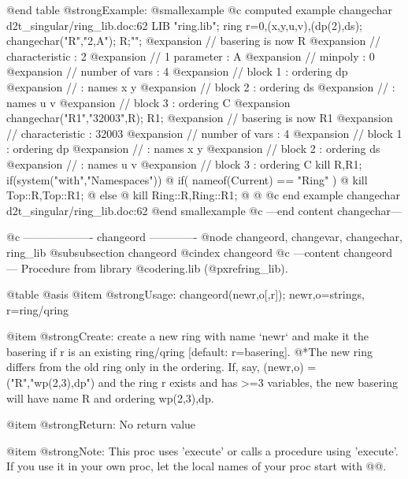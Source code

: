 @end table
@strong{Example:}
@smallexample
@c computed example changechar d2t_singular/ring_lib.doc:62 
LIB "ring.lib";
ring r=0,(x,y,u,v),(dp(2),ds);
changechar("R","2,A"); R;"";
@expansion{} // basering is now R
@expansion{} //   characteristic : 2
@expansion{} //   1 parameter    : A 
@expansion{} //   minpoly        : 0
@expansion{} //   number of vars : 4
@expansion{} //        block   1 : ordering dp
@expansion{} //                  : names    x y 
@expansion{} //        block   2 : ordering ds
@expansion{} //                  : names    u v 
@expansion{} //        block   3 : ordering C
@expansion{} 
changechar("R1","32003",R); R1;
@expansion{} // basering is now R1
@expansion{} //   characteristic : 32003
@expansion{} //   number of vars : 4
@expansion{} //        block   1 : ordering dp
@expansion{} //                  : names    x y 
@expansion{} //        block   2 : ordering ds
@expansion{} //                  : names    u v 
@expansion{} //        block   3 : ordering C
kill R,R1;
if(system("with","Namespaces")) @{
if( nameof(Current) == "Ring" ) @{
kill Top::R,Top::R1;
@} else @{
kill Ring::R,Ring::R1;
@}
@}
@c end example changechar d2t_singular/ring_lib.doc:62
@end smallexample
@c ---end content changechar---

@c ------------------- changeord -------------
@node changeord, changevar, changechar, ring_lib
@subsubsection changeord
@cindex changeord
@c ---content changeord---
Procedure from library @code{ring.lib} (@pxref{ring_lib}).

@table @asis
@item @strong{Usage:}
changeord(newr,o[,r]); newr,o=strings, r=ring/qring

@item @strong{Create:}
create a new ring with name `newr` and make it the basering if r is
an existing ring/qring [default: r=basering].
@*The new ring differs from the old ring only in the ordering. If, say,
(newr,o) = ("R","wp(2,3),dp") and the ring r exists and has >=3
variables, the new basering will have name R and ordering wp(2,3),dp.

@item @strong{Return:}
No return value

@item @strong{Note:}
This proc uses 'execute' or calls a procedure using 'execute'.
If you use it in your own proc, let the local names of your proc
start with @@.

